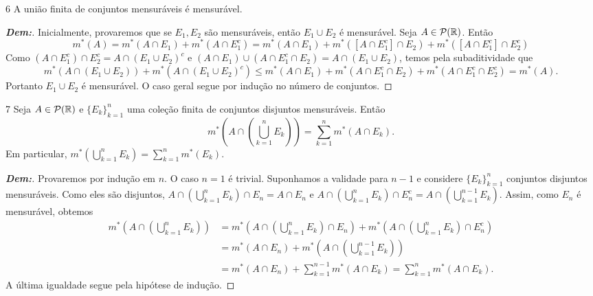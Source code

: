 \begin{prop*}{6}
A união finita de conjuntos mensuráveis é mensurável.
\end{prop*}

\begin{proof}[\textbf{Dem:}]
Inicialmente, provaremos que se $E_1, E_2$ são mensuráveis, então $E_1 \cup E_2$ é mensurável. Seja $A \in \mathcal{P}(\mathbb{R})$. Então
$$ m^*(A) = m^*(A \cap E_1) + m^*(A \cap E_1^c) = m^*(A \cap E_1) + m^*([A \cap E_1^c] \cap E_2) + m^*([A \cap E_1^c] \cap E_2^c) $$
Como $(A \cap E_1^c) \cap E_2^c = A \cap (E_1 \cup E_2)^c$ e $(A \cap E_1) \cup (A \cap E_1^c \cap E_2) = A \cap (E_1 \cup E_2)$, temos pela subaditividade que
$$ m^*(A \cap (E_1 \cup E_2)) + m^*(A \cap (E_1 \cup E_2)^c) \le m^*(A \cap E_1) + m^*(A \cap E_1^c \cap E_2) + m^*(A \cap E_1^c \cap E_2^c) = m^*(A). $$
Portanto $E_1 \cup E_2$ é mensurável. O caso geral segue por indução no número de conjuntos.
\end{proof}

\begin{prop*}{7}
Seja $A \in \mathcal{P}(\mathbb{R})$ e $\{E_k\}_{k=1}^n$ uma coleção finita de conjuntos disjuntos mensuráveis. Então
$$ m^*\left(A \cap \left(\bigcup_{k=1}^n E_k\right)\right) = \sum_{k=1}^n m^*(A \cap E_k). $$
Em particular, $m^*\left(\bigcup_{k=1}^n E_k\right) = \sum_{k=1}^n m^*(E_k)$.
\end{prop*}

\begin{proof}[\textbf{Dem:}]
Provaremos por indução em $n$. O caso $n=1$ é trivial. Suponhamos a validade para $n-1$ e considere $\{E_k\}_{k=1}^n$ conjuntos disjuntos mensuráveis.
Como eles são disjuntos, $A \cap \left(\bigcup_{k=1}^n E_k\right) \cap E_n = A \cap E_n$ e $A \cap \left(\bigcup_{k=1}^n E_k\right) \cap E_n^c = A \cap \left(\bigcup_{k=1}^{n-1} E_k\right)$.
Assim, como $E_n$ é mensurável, obtemos
\begin{align*}
    m^*\left(A \cap \left(\bigcup_{k=1}^n E_k\right)\right) &= m^*\left(A \cap \left(\bigcup_{k=1}^n E_k\right) \cap E_n\right) + m^*\left(A \cap \left(\bigcup_{k=1}^n E_k\right) \cap E_n^c\right) \\
    &= m^*(A \cap E_n) + m^*\left(A \cap \left(\bigcup_{k=1}^{n-1} E_k\right)\right) \\
    &= m^*(A \cap E_n) + \sum_{k=1}^{n-1} m^*(A \cap E_k) = \sum_{k=1}^n m^*(A \cap E_k).
\end{align*}
A última igualdade segue pela hipótese de indução.
\end{proof}

